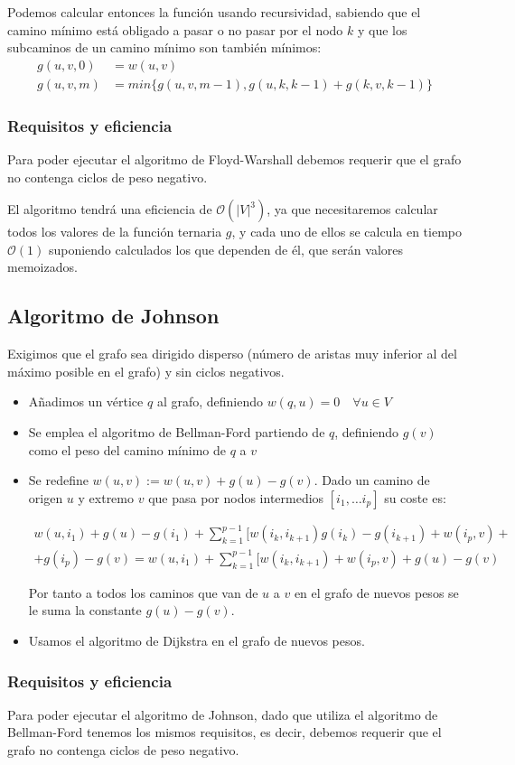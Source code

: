 \documentclass[a4paper, 11pt]{article} %
\begin{document}
      Podemos calcular entonces la función usando recursividad, sabiendo que el
      camino mínimo está obligado a pasar o no pasar por el nodo $k$ y que los
      subcaminos de un camino mínimo son también mínimos:
      \begin{equation}
	\begin{split}
	g(u,v,0) &= w(u,v) \\
	g(u,v,m) &= min\{g(u,v,m-1), g(u,k,k-1)+g(k,v,k-1)\}
	\end{split}
      \end{equation}
    
    \subsubsection{Requisitos y eficiencia}
      Para poder ejecutar el algoritmo de Floyd-Warshall debemos requerir que el grafo
      no contenga ciclos de peso negativo.
      
      El algoritmo tendrá una eficiencia de $\mathcal{O}(|V|^3)$, ya que necesitaremos calcular
      todos los valores de la función ternaria $g$, y cada uno de ellos se calcula
      en tiempo $\mathcal{O}(1)$ suponiendo calculados los que dependen de él, que serán valores
      memoizados.
  
  \subsection{Algoritmo de Johnson}
      Exigimos que el grafo sea dirigido disperso (número de aristas muy inferior al del
      máximo posible en el grafo) y sin ciclos negativos.
      
      
    \begin{itemize}
      \item Añadimos un vértice $q$ al grafo, definiendo $w(q,u) = 0 \quad \forall u \in V$
      \item Se emplea el algoritmo de Bellman-Ford partiendo de $q$, definiendo
	$g(v)$ como el peso del camino mínimo de $q$ a $v$
      \item Se redefine $w(u,v):=w(u,v) + g(u)-g(v)$. Dado un camino de origen $u$ y
	extremo $v$ que pasa por nodos intermedios $[i_1,\ldots i_p]$ su coste es:
	
	\begin{eqnarray*}
	w(u,i_1) + g(u) -g(i_1) + \sum_{k=1}^{p-1} [w(i_{k},i_{k+1}) g(i_k) - g(i_{k+1}) + w(i_p,v) + \\
	+ g(i_p)- g(v) = w(u,i_1) + \sum_{k=1}^{p-1} [w(i_{k},i_{k+1}) + w(i_p,v) + g(u) - g(v)
	\end{eqnarray*}
	
	Por tanto a todos los caminos que van de $u$ a $v$ en el grafo de nuevos pesos
	se le suma la constante $g(u) - g(v)$.
      \item Usamos el algoritmo de Dijkstra en el grafo de nuevos pesos.
    \end{itemize}
    
      \subsubsection{Requisitos y eficiencia}
	Para poder ejecutar el algoritmo de Johnson, dado que utiliza el algoritmo de Bellman-Ford tenemos los mismos 
	requisitos, es decir, debemos requerir que el grafo no contenga ciclos de peso negativo.
	
\end{document}
